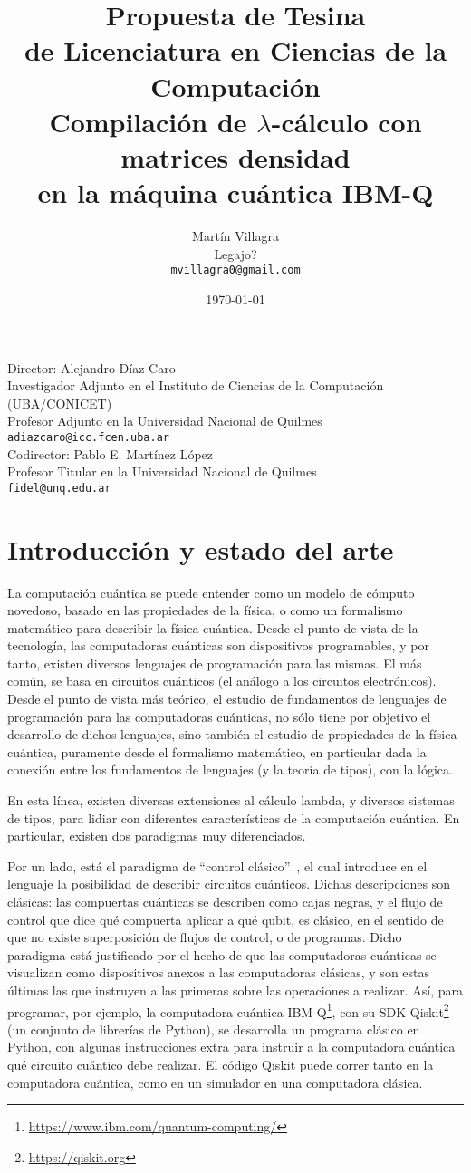\documentclass[a4paper]{article}
\title{
  {\normalsize\sc Propuesta de Tesina\\ de Licenciatura en Ciencias de la
    Computación}\\
  Compilación de $\lambda$-cálculo con matrices densidad\\
  en la máquina cuántica IBM-Q
}
\author{
  Martín Villagra\\
  \todo Legajo?\\
  {\tt mvillagra0@gmail.com}
}
\date{\today}
\begin{document}
\maketitle
\noindent  Director: Alejandro Díaz-Caro\\
Investigador Adjunto en el Instituto de Ciencias de la Computación
(UBA/CONICET)\\
Profesor Adjunto en la Universidad Nacional de Quilmes\\
{\tt adiazcaro@icc.fcen.uba.ar}\\[1ex]
Codirector: Pablo E. Martínez López\\
Profesor Titular en la Universidad Nacional de Quilmes\\
{\tt fidel@unq.edu.ar}

\section*{Introducción y estado del arte}
La computación cuántica se puede entender como un modelo de cómputo novedoso,
basado en las propiedades de la física, o como un formalismo matemático para
describir la física cuántica. Desde el punto de vista de la tecnología, las
computadoras cuánticas son dispositivos programables, y por tanto, existen
diversos lenguajes de programación para las mismas. El más común, se basa en
circuitos cuánticos (el análogo a los circuitos electrónicos). Desde el punto de
vista más teórico, el estudio de fundamentos de lenguajes de programación para
las computadoras cuánticas, no sólo tiene por objetivo el desarrollo de dichos
lenguajes, sino también el estudio de propiedades de la física cuántica,
puramente desde el formalismo matemático, en particular dada la conexión entre
los fundamentos de lenguajes (y la teoría de tipos), con la lógica.

En esta línea, existen diversas extensiones al cálculo lambda, y diversos
sistemas de tipos, para lidiar con diferentes características de la computación
cuántica. En particular, existen dos paradigmas muy diferenciados.

Por un lado, está el paradigma de ``control clásico''~\cite{SelingerMSCS04}, el
cual introduce en el lenguaje la posibilidad de describir circuitos cuánticos.
Dichas descripciones son clásicas: las compuertas cuánticas se describen como
cajas negras, y el flujo de control que dice qué compuerta aplicar a qué qubit,
es clásico, en el sentido de que no existe superposición de flujos de control, o
de programas. Dicho paradigma está justificado por el hecho de que las
computadoras cuánticas se visualizan como dispositivos anexos a las computadoras
clásicas, y son estas últimas las que instruyen a las primeras sobre las
operaciones a realizar. Así, para programar, por ejemplo, la computadora
cuántica IBM-Q\footnote{\url{https://www.ibm.com/quantum-computing/}}, con su
SDK Qiskit\footnote{\url{https://qiskit.org}} (un conjunto de librerías de
Python), se desarrolla un programa clásico en Python, con algunas instrucciones
extra para instruir a la computadora cuántica qué circuito cuántico debe
realizar. El código Qiskit puede correr tanto en la computadora cuántica, como
en un simulador en una computadora clásica.
\end{document}
